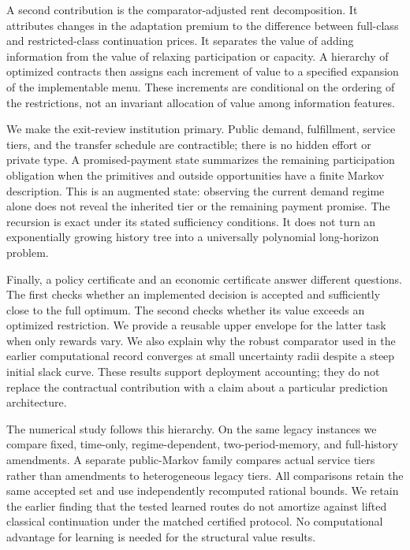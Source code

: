 \documentclass[11pt,letterpaper]{article}
\theoremstyle{definition}\newtheorem{assumption}[theorem]{Assumption}
\begin{document}
A second contribution is the comparator-adjusted rent decomposition. It attributes changes in the adaptation premium to the difference between full-class and restricted-class continuation prices. It separates the value of adding information from the value of relaxing participation or capacity. A hierarchy of optimized contracts then assigns each increment of value to a specified expansion of the implementable menu. These increments are conditional on the ordering of the restrictions, not an invariant allocation of value among information features.

We make the exit-review institution primary. Public demand, fulfillment, service tiers, and the transfer schedule are contractible; there is no hidden effort or private type. A promised-payment state summarizes the remaining participation obligation when the primitives and outside opportunities have a finite Markov description. This is an augmented state: observing the current demand regime alone does not reveal the inherited tier or the remaining payment promise. The recursion is exact under its stated sufficiency conditions. It does not turn an exponentially growing history tree into a universally polynomial long-horizon problem.

Finally, a policy certificate and an economic certificate answer different questions. The first checks whether an implemented decision is accepted and sufficiently close to the full optimum. The second checks whether its value exceeds an optimized restriction. We provide a reusable upper envelope for the latter task when only rewards vary. We also explain why the robust comparator used in the earlier computational record converges at small uncertainty radii despite a steep initial slack curve. These results support deployment accounting; they do not replace the contractual contribution with a claim about a particular prediction architecture.

The numerical study follows this hierarchy. On the same legacy instances we compare fixed, time-only, regime-dependent, two-period-memory, and full-history amendments. A separate public-Markov family compares actual service tiers rather than amendments to heterogeneous legacy tiers. All comparisons retain the same accepted set and use independently recomputed rational bounds. We retain the earlier finding that the tested learned routes do not amortize against lifted classical continuation under the matched certified protocol. No computational advantage for learning is needed for the structural value results.
\end{document}
